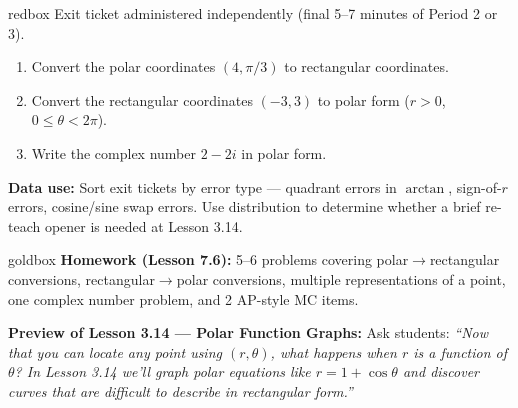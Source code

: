 \documentclass[10pt]{article}
\begin{document}
\vspace{0.08in}

\begin{skillbox}{redbox}
Exit ticket administered independently (final 5--7 minutes of Period 2 or 3).

\begin{enumerate}[leftmargin=1.4em, itemsep=4pt]
  \item Convert the polar coordinates $(4,\pi/3)$ to rectangular coordinates.
  \item Convert the rectangular coordinates $(-3,3)$ to polar form ($r > 0$,
    $0 \le \theta < 2\pi$).
  \item Write the complex number $2-2i$ in polar form.
\end{enumerate}

\textbf{Data use:} Sort exit tickets by error type --- quadrant errors in
$\arctan$, sign-of-$r$ errors, cosine/sine swap errors. Use distribution
to determine whether a brief re-teach opener is needed at Lesson 3.14.
\end{skillbox}

\vspace{0.08in}

\begin{skillbox}{goldbox}
\textbf{Homework (Lesson 7.6):} 5--6 problems covering polar$\to$rectangular
conversions, rectangular$\to$polar conversions, multiple representations of a
point, one complex number problem, and 2 AP-style MC items.

\textbf{Preview of Lesson 3.14 --- Polar Function Graphs:}
Ask students: \textit{``Now that you can locate any point using $(r,\theta)$,
what happens when $r$ is a \emph{function} of $\theta$? In Lesson 3.14 we'll
graph polar equations like $r = 1+\cos\theta$ and discover curves that are
difficult to describe in rectangular form.''}
\end{skillbox}
\end{document}
